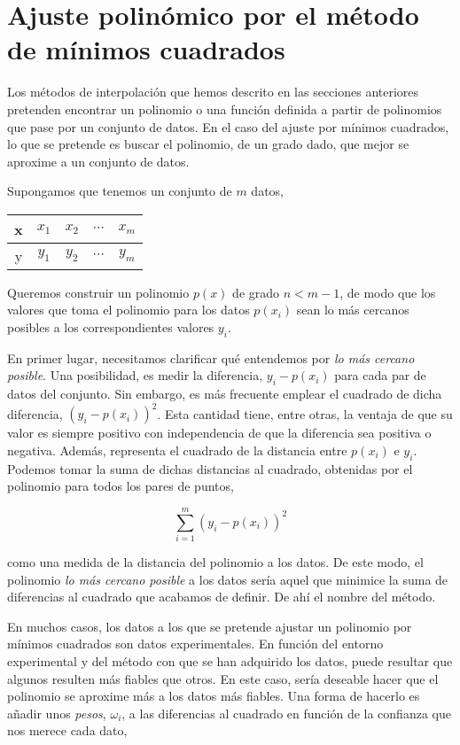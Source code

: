 \section{Ajuste polinómico por el método de mínimos cuadrados}\label{sec:mc} 
Los métodos de interpolación que hemos descrito en las secciones anteriores pretenden encontrar un polinomio o una función definida a partir de polinomios que pase por un conjunto de datos. En el caso del ajuste por mínimos cuadrados, lo que se pretende es buscar el polinomio, de un grado dado, que mejor se aproxime a un conjunto de datos.

Supongamos que tenemos un conjunto de $m$ datos, 

\begin{table}[h]
\centering
\begin{tabular}{c|cccc}
x&$x_1$&$x_2$&$\cdots$&$x_m$\\
\hline
y&$y_1$&$y_2$&$\cdots$&$y_m$
\end{tabular}
\end{table} 
 
Queremos construir un polinomio $p(x)$  de grado $n < m-1$, de modo que los valores que toma el polinomio para los datos $p(x_i)$ sean lo más cercanos posibles a los correspondientes valores $y_i$. 

En primer lugar, necesitamos clarificar qué entendemos por \emph{lo más cercano posible}.  Una posibilidad, es medir la diferencia, $y_i-p(x_i)$ para cada par de datos del conjunto. Sin embargo, es más frecuente emplear el cuadrado de dicha diferencia, $\left(y_i-p(x_i)\right)^2$. Esta cantidad tiene, entre otras, la ventaja de que su valor es siempre positivo con  independencia de que la diferencia sea positiva o negativa. Además, representa el cuadrado de la distancia entre $p(x_i)$ e $y_i$. Podemos tomar la suma de dichas distancias al cuadrado, obtenidas por el polinomio para todos los pares de puntos, 

\begin{equation*}
\sum_{i=1}^m \left(y_i-p(x_i)\right)^2
\end{equation*}

como una medida de la distancia del polinomio a los datos.  De este modo,  el polinomio \emph{lo más cercano posible}  a los datos sería aquel que minimice la suma de diferencias al cuadrado que acabamos de definir. De ahí el nombre del método.

En muchos casos, los datos a los que se pretende ajustar un polinomio por mínimos cuadrados son datos experimentales. En función del entorno experimental y del método con que se han adquirido los datos, puede resultar que algunos resulten más fiables que otros. En este caso, sería deseable hacer que el polinomio se aproxime más a los datos más fiables. Una forma de hacerlo es añadir unos \emph{pesos}, $\omega_i$, a las diferencias al  cuadrado en función de la confianza que nos merece cada dato,

